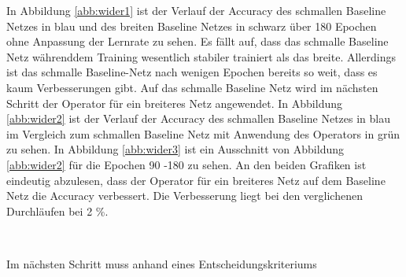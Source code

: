 In Abbildung \ref{abb:wider1} ist der Verlauf der Accuracy des schmallen Baseline Netzes in blau und des breiten Baseline Netzes in schwarz über 180 Epochen ohne Anpassung der Lernrate zu sehen. Es fällt auf, dass das schmalle Baseline Netz währenddem Training wesentlich stabiler trainiert als das breite. Allerdings ist das schmalle Baseline-Netz nach wenigen Epochen bereits so weit, dass es kaum Verbesserungen gibt. Auf das schmalle Baseline Netz wird im nächsten Schritt der Operator für ein breiteres Netz angewendet. In Abbildung \ref{abb:wider2} ist der Verlauf der Accuracy des schmallen Baseline Netzes in blau im Vergleich zum schmallen Baseline Netz mit Anwendung des Operators in grün zu sehen. In Abbildung \ref{abb:wider3} ist ein Ausschnitt von Abbildung \ref{abb:wider2} für die Epochen 90 -180 zu sehen. An den beiden Grafiken ist eindeutig abzulesen, dass der Operator für ein breiteres Netz auf dem Baseline Netz die Accuracy verbessert. Die Verbesserung liegt bei den verglichenen Durchläufen bei 2 \%. 



\begin{figure}
     \centering
     \hfill
     \\
     \caption{}
     \label{abb:memory}
\end{figure}
Im nächsten Schritt muss anhand eines Entscheidungskriteriums 


\color{black}
